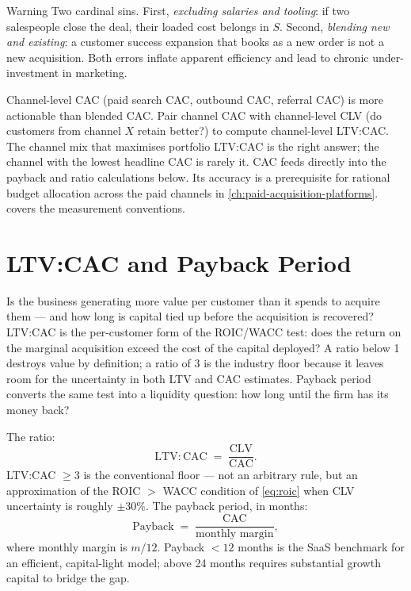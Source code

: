 \begin{admonition}{Warning}
Two cardinal sins. First, \emph{excluding salaries and tooling}: if two salespeople close the deal, their loaded cost belongs in \(S\). Second, \emph{blending new and existing}: a customer success expansion that books as a new order is not a new acquisition. Both errors inflate apparent efficiency and lead to chronic under-investment in marketing.
\end{admonition}

Channel-level CAC (paid search CAC, outbound CAC, referral CAC) is more actionable than blended CAC. Pair channel CAC with channel-level CLV (do customers from channel \(X\) retain better?) to compute channel-level LTV:CAC. The channel mix that maximises portfolio LTV:CAC is the right answer; the channel with the lowest headline CAC is rarely it. CAC feeds directly into the payback and ratio calculations below. Its accuracy is a prerequisite for rational budget allocation across the paid channels in \cref{ch:paid-acquisition-platforms}. \textcite{bendle2020marketing} covers the measurement conventions.

\section{LTV:CAC and Payback Period}\label{sec:ltv-cac}

Is the business generating more value per customer than it spends to acquire them --- and how long is capital tied up before the acquisition is recovered? LTV:CAC is the per-customer form of the ROIC/WACC test: does the return on the marginal acquisition exceed the cost of the capital deployed? A ratio below 1 destroys value by definition; a ratio of 3 is the industry floor because it leaves room for the uncertainty in both LTV and CAC estimates. Payback period converts the same test into a liquidity question: how long until the firm has its money back?

The ratio:
\begin{equation}\label{eq:ltv-cac}
  \mathrm{LTV:CAC} \;=\; \frac{\mathrm{CLV}}{\mathrm{CAC}} .
\end{equation}
LTV:CAC \(\ge 3\) is the conventional floor --- not an arbitrary rule, but an approximation of the ROIC \(>\) WACC condition of \cref{eq:roic} when CLV uncertainty is roughly \(\pm 30\%\). The payback period, in months:
\begin{equation}\label{eq:cac-payback}
  \mathrm{Payback} \;=\; \frac{\mathrm{CAC}}{\text{monthly margin}} ,
\end{equation}
where monthly margin is \(m/12\). Payback \(< 12\) months is the SaaS benchmark for an efficient, capital-light model; above 24 months requires substantial growth capital to bridge the gap.

